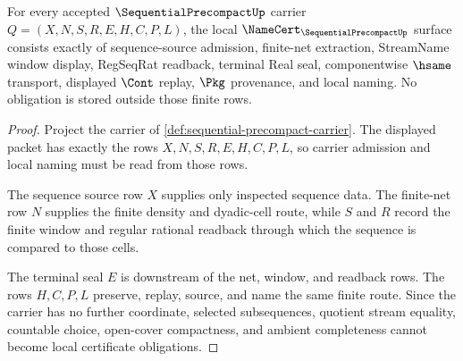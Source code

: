\begin{theorem}
\label{thm:sequential-precompact-namecert-obligations}
For every accepted $\SequentialPrecompactUp$ carrier $Q=(X,N,S,R,E,H,C,P,L)$, the local $\NameCert_{\SequentialPrecompactUp}$ surface consists exactly of sequence-source admission, finite-net extraction, StreamName window display, RegSeqRat readback, terminal Real seal, componentwise $\hsame$ transport, displayed $\Cont$ replay, $\Pkg$ provenance, and local naming. No obligation is stored outside those finite rows.
\end{theorem}
\begin{proof}
Project the carrier of \autoref{def:sequential-precompact-carrier}. The displayed packet has exactly the rows $X,N,S,R,E,H,C,P,L$, so carrier admission and local naming must be read from those rows.

The sequence source row $X$ supplies only inspected sequence data. The finite-net row $N$ supplies the finite density and dyadic-cell route, while $S$ and $R$ record the finite window and regular rational readback through which the sequence is compared to those cells.

The terminal seal $E$ is downstream of the net, window, and readback rows. The rows $H,C,P,L$ preserve, replay, source, and name the same finite route. Since the carrier has no further coordinate, selected subsequences, quotient stream equality, countable choice, open-cover compactness, and ambient completeness cannot become local certificate obligations.
\end{proof}

